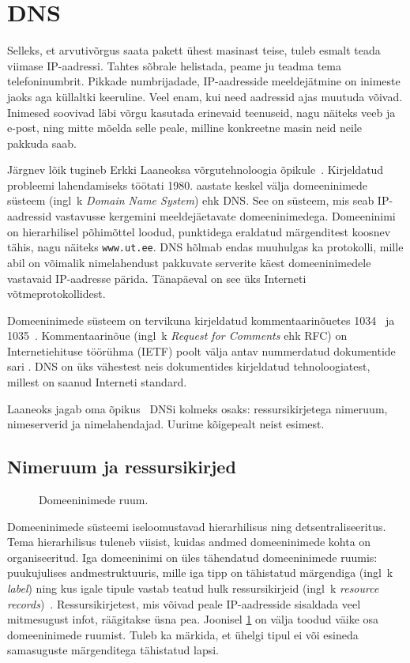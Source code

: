 \documentclass[../main.tex]{subfiles}
\begin{document}
\newpage
\section{DNS}

Selleks, et arvutivõrgus saata pakett ühest masinast teise, tuleb esmalt teada viimase IP-aadressi.
Tahtes sõbrale helistada, peame ju teadma tema telefoninumbrit.
Pikkade numbrijadade, IP-aadresside meeldejätmine on inimeste jaoks aga küllaltki keeruline.
Veel enam, kui need aadressid ajas muutuda võivad.
Inimesed soovivad läbi võrgu kasutada erinevaid teenuseid, nagu näiteks veeb ja e-post, ning mitte mõelda selle peale, milline konkreetne masin neid neile pakkuda saab.

Järgnev lõik tugineb Erkki Laaneoksa võrgutehnoloogia õpikule~\cite{laaneoks2010}.
Kirjeldatud probleemi lahendamiseks töötati 1980. aastate keskel välja domeeninimede süsteem (ingl~k \textit{Domain Name System}) ehk DNS.
See on süsteem, mis seab IP-aadressid vastavusse kergemini meeldejäetavate domeeninimedega.
Domeeninimi on hierarhilisel põhimõttel loodud, punktidega eraldatud märgenditest koosnev tähis, nagu näiteks \texttt{www.ut.ee}.
DNS hõlmab endas muuhulgas ka protokolli, mille abil on võimalik nimelahendust pakkuvate serverite käest domeeninimedele vastavaid IP-aadresse pärida.
Tänapäeval on see üks Interneti võtmeprotokollidest.

Domeeninimede süsteem on tervikuna kirjeldatud kommentaarinõuetes 1034~\cite{rfc1034} ja 1035~\cite{rfc1035}.
Kommentaarinõue (ingl~k \textit{Request for Comments} ehk RFC) on Internetiehituse töörühma (IETF) poolt välja antav nummerdatud dokumentide sari \cite{ietf}.
DNS on üks vähestest neis dokumentides kirjeldatud tehnoloogiatest, millest on saanud Interneti standard.

Laaneoks jagab oma õpikus~\cite{laaneoks2010} DNSi kolmeks osaks: ressursikirjetega nimeruum, nimeserverid ja nimelahendajad. Uurime kõigepealt neist esimest.


\subsection{Nimeruum ja ressursikirjed}

\begin{figure}[ht]
  \caption{Domeeninimede ruum.}
  \label{fig:domain-name-space}
\end{figure}

Domeeninimede süsteemi iseloomustavad hierarhilisus ning detsentraliseeritus.
Tema hierarhilisus tuleneb viisist, kuidas andmed domeeninimede kohta on organiseeritud.
Iga domeeninimi on üles tähendatud domeeninimede ruumis: puukujulises andmestruktuuris, mille iga tipp on tähistatud märgendiga (ingl~k \textit{label}) ning kus igale tipule vastab teatud hulk ressursikirjeid (ingl~k \textit{resource records})~\cite{rfc1034}.
Ressursikirjetest, mis võivad peale IP-aadresside sisaldada veel mitmesugust infot, räägitakse üsna pea.
Joonisel \ref{fig:domain-name-space} on välja toodud väike osa domeeninimede ruumist.
Tuleb ka märkida, et ühelgi tipul ei või esineda samasuguste märgenditega tähistatud lapsi.
\end{document}

